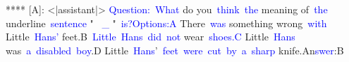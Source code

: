\documentclass{article}
\begin{document}
\begin{tcolorbox}[colframe=black,colback=white]
****
[A]:
<|assistant|>
\textcolor{blue}{Question}\textcolor{blue}{:}\textcolor{blue}{~What} do you\textcolor{blue}{~think}\textcolor{blue}{~the} meaning of\textcolor{blue}{~the} underline\textcolor{blue}{~sentence} " \textcolor{blue}{~\_}  "\textcolor{blue}{~is}\textcolor{blue}{?}\textcolor{blue}{Options}\textcolor{blue}{:A} There\textcolor{blue}{~was} something wrong\textcolor{blue}{~with} Little\textcolor{blue}{~Hans}\textcolor{blue}{'} feet.B\textcolor{blue}{~Little}\textcolor{blue}{~Hans}\textcolor{blue}{~did}\textcolor{blue}{~not} wear\textcolor{blue}{~shoes}\textcolor{blue}{.C} Little\textcolor{blue}{~Hans} was\textcolor{blue}{~a}\textcolor{blue}{~disabled}\textcolor{blue}{~boy}.D Little\textcolor{blue}{~Hans}'\textcolor{blue}{~feet}\textcolor{blue}{~were}\textcolor{blue}{~cut}\textcolor{blue}{~by}\textcolor{blue}{~a}\textcolor{blue}{~sharp} knife.An\textcolor{blue}{swer}:B\textcolor{blue}{}
\end{tcolorbox}
\end{document}
